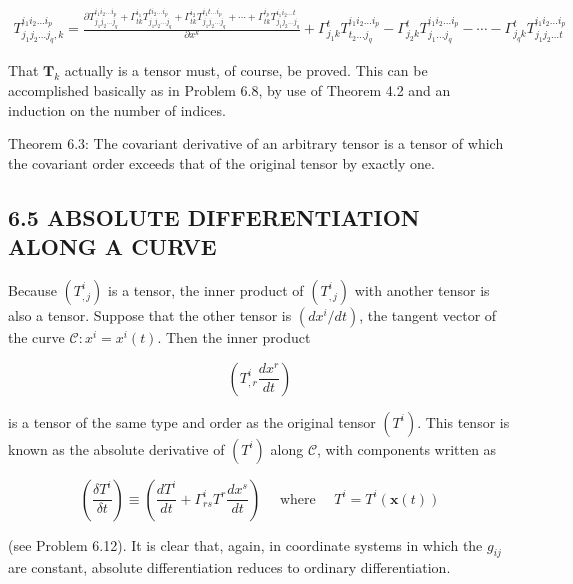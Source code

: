 \documentclass[10pt]{article}
\begin{document}
\begin{gather*}
T_{j_{1} j_{2} \ldots j_{q}, k}^{i_{1} i_{2} \ldots i_{p}}=\frac{\partial T_{j_{1} j_{2} \ldots j_{q}}^{i_{1} i_{2} \ldots i_{p}}+\Gamma_{t k}^{i_{1}} T_{j_{1} j_{2} \ldots j_{q}}^{t i_{2} \ldots i_{p}}+\Gamma_{t k}^{i_{2}} T_{j_{1} j_{2} \ldots j_{q}}^{i_{1} t \ldots i_{p}}+\cdots+\Gamma_{t k}^{i_{p}} T_{j_{1} j_{2} \ldots j_{q}}^{i_{1} i_{2} \ldots t}}{\partial x^{k}}+\Gamma_{j_{1} k}^{t} T_{t_{2} \ldots j_{q}}^{i_{1} i_{2} \ldots i_{p}}-\Gamma_{j_{2} k}^{t} T_{j_{1} \ldots j_{q}}^{i_{1} i_{2} \ldots i_{p}}-\cdots-\Gamma_{j_{q} k}^{t} T_{j_{1} j_{2} \ldots t}^{i_{1} i_{2} \ldots i_{p}}
\end{gather*}


That $\mathbf{T}_{k}$ actually is a tensor must, of course, be proved. This can be accomplished basically as in Problem 6.8, by use of Theorem 4.2 and an induction on the number of indices.

Theorem 6.3: The covariant derivative of an arbitrary tensor is a tensor of which the covariant order exceeds that of the original tensor by exactly one.

\subsection*{6.5 ABSOLUTE DIFFERENTIATION ALONG A CURVE}
Because $\left(T_{, j}^{i}\right)$ is a tensor, the inner product of $\left(T_{, j}^{i}\right)$ with another tensor is also a tensor. Suppose that the other tensor is $\left(d x^{i} / d t\right)$, the tangent vector of the curve $\mathscr{C}: x^{i}=x^{i}(t)$. Then the inner product

$$
\left(T_{, r}^{i} \frac{d x^{r}}{d t}\right)
$$

is a tensor of the same type and order as the original tensor $\left(T^{i}\right)$. This tensor is known as the absolute derivative of $\left(T^{i}\right)$ along $\mathscr{C}$, with components written as


\begin{equation*}
\left(\frac{\delta T^{i}}{\delta t}\right) \equiv\left(\frac{d T^{i}}{d t}+\Gamma_{r s}^{i} T^{r} \frac{d x^{s}}{d t}\right) \quad \text { where } \quad T^{i}=T^{i}(\mathbf{x}(t)) \tag{6.8}
\end{equation*}


(see Problem 6.12). It is clear that, again, in coordinate systems in which the $g_{i j}$ are constant, absolute differentiation reduces to ordinary differentiation.
\end{document}
